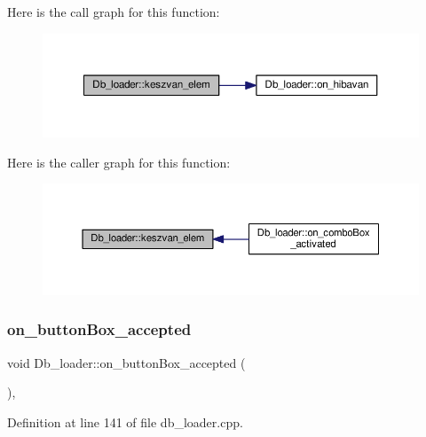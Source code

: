 Here is the call graph for this function\+:\nopagebreak
\begin{figure}[H]
\begin{center}
\leavevmode
\includegraphics[width=350pt]{classDb__loader_a089a424b1719bfbf4068b10bd1070614_cgraph}
\end{center}
\end{figure}
Here is the caller graph for this function\+:\nopagebreak
\begin{figure}[H]
\begin{center}
\leavevmode
\includegraphics[width=350pt]{classDb__loader_a089a424b1719bfbf4068b10bd1070614_icgraph}
\end{center}
\end{figure}
\mbox{\label{classDb__loader_a29a8fa0c0dbc868c7ef0836b27d078f3}} 
\subsubsection{\texorpdfstring{on\+\_\+button\+Box\+\_\+accepted}{on\_buttonBox\_accepted}}
{\footnotesize\ttfamily void Db\+\_\+loader\+::on\+\_\+button\+Box\+\_\+accepted (\begin{DoxyParamCaption}{ }\end{DoxyParamCaption})\hspace{0.3cm}{\ttfamily [private]}, {\ttfamily [slot]}}



Definition at line 141 of file db\+\_\+loader.\+cpp.

